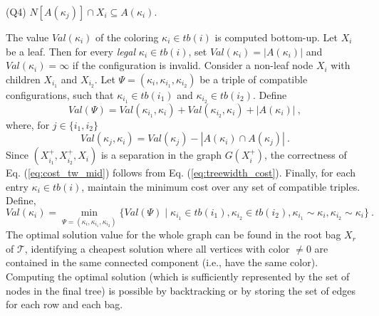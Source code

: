 \documentclass[12pt]{article}
\newcommand{\TD}[0]{\mathcal{T}}
\begin{document}
(Q4) $N[A(\kappa_j)] \cap X_i \subseteq A(\kappa_i)$.
\par The value $Val(\kappa_i)$ of the coloring $\kappa_i \in tb(i)$ is computed bottom-up. Let $X_i$ be a leaf. Then for every \emph{legal} $\kappa_i \in tb(i)$, set $Val(\kappa_i)=|A(\kappa_i)|$ and $Val(\kappa_i)=\infty$ if the configuration is invalid. Consider a non-leaf node $X_i$ with children $X_{i_1}$ and $X_{i_2}$. Let $\Psi=(\kappa_{i}, \kappa_{i_1}, \kappa_{i_2})$ be a triple of compatible configurations, such that $\kappa_{i_1} \in tb(i_1)$ and $\kappa_{i_2}\in tb(i_2)$.
Define
\begin{equation}
\label{eq:cost_tw_mid}
Val(\Psi)=Val(\kappa_{i_1}, \kappa_{i})+Val(\kappa_{i_2}, \kappa_{i})+|A(\kappa_{i})|~,
\end{equation}
where, for $j \in \{i_1,i_2\}$
\begin{equation}
\label{eq:cost_tw_mid_2}
Val(\kappa_{j}, \kappa_{i})=Val(\kappa_{j})-|A(\kappa_{i}) \cap A(\kappa_{j})|~.
\end{equation}
Since $(X_{i_1}^{+},X_{i_2}^{+},X_i)$ is a separation in the graph $G(X_i^{+})$, the correctness of Eq. (\ref{eq:cost_tw_mid}) follows from Eq. (\ref{eq:treewidth_cost}). Finally, for each entry $\kappa_i \in tb(i)$, maintain the minimum cost over any set of compatible triples.  Define,
\begin{equation}
\label{eq:alg_cost}
Val(\kappa_i)=\min_{\Psi=(\kappa_i, \kappa_{i_1},\kappa_{i_2})} \{Val(\Psi) \mid
\kappa_{i_1} \in tb(i_1),\kappa_{i_2} \in tb(i_2),
\kappa_{i_1} \sim \kappa_{i}, \kappa_{i_2} \sim \kappa_{i}\}~.
\end{equation}
The optimal solution value for the whole graph can be found in the root bag $X_{r}$ of $\TD$, identifying a cheapest solution where all vertices with color $\neq 0$ are contained in the same connected component (i.e., have the same color).
Computing the optimal solution (which is sufficiently represented by the set of nodes in the final tree) is possible by backtracking or by storing the set of edges for each row and each bag.
\end{document}
